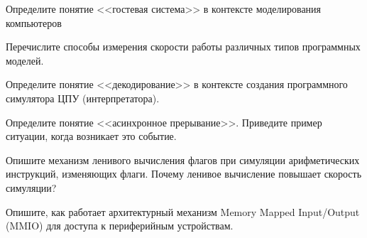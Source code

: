 \documentclass[a4paper, addpoints]{exam}
\begin{document}
\begin{questions}



\question[2] Определите понятие <<гостевая система>> в контексте моделирования компьютеров
\begin{solution}[2cm]
\end{solution}

\question[2] Перечислите способы измерения скорости работы различных типов программных моделей.
\begin{solution}[2cm]
\end{solution}

\question[2] Определите понятие <<декодирование>> в контексте создания программного симулятора ЦПУ (интерпретатора).
\begin{solution}[2cm]
\end{solution}

\question[2] Определите понятие <<асинхронное прерывание>>. Приведите пример ситуации, когда возникает это событие.
\begin{solution}[2cm]
\end{solution}

\question[2] Опишите механизм ленивого вычисления флагов при симуляции арифметических инструкций, изменяющих флаги. Почему ленивое вычисление повышает скорость симуляции?
\begin{solution}[2cm]
\end{solution}

\question[2] Опишите, как работает архитектурный механизм Memory Mapped Input/Output (MMIO) для доступа к периферийным устройствам.
\begin{solution}[2cm]
\end{solution}


\end{questions}
\end{document}
